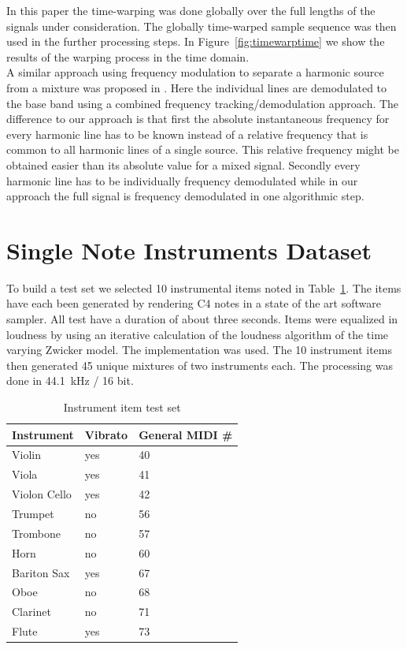 In this paper the time-warping was done globally over the full lengths of the
signals under consideration. The globally time-warped sample sequence
was then used in the further processing steps. In Figure~\ref{fig:timewarptime} we show the results of the warping process in the time domain. \\

A similar approach using frequency modulation to separate a harmonic
source from a mixture was proposed in \cite{wang95}. Here the
individual lines are demodulated to the base band using a combined frequency
tracking/demodulation approach. The difference to our approach is that first
the absolute instantaneous frequency for every harmonic line has to be known
instead of a relative frequency that is common to all harmonic lines of a single
source. This relative frequency might be obtained easier than its
absolute value for a mixed signal. Secondly every harmonic line has to be individually
frequency demodulated while in our approach the full signal is frequency demodulated in one algorithmic step.\\

\section{Single Note Instruments Dataset} %
\label{sub:test_set}

To build a test set we selected 10 instrumental items noted in Table~\ref{tab:testset}. The items have each been generated by rendering C4 notes in a state of the art software sampler. All test have a duration of about three seconds. Items were equalized in loudness by using an iterative calculation of the loudness algorithm of the time varying Zwicker model. The implementation \cite{genesis12} was used. The 10 instrument items then generated 45 unique mixtures of two instruments each. The processing was done in 44.1~kHz / 16 bit.

\begin{table}
\begin{center}
\footnotesize
\begin{tabular}{ l l l}
  Instrument & Vibrato &  General MIDI \# \\
  \hline
  Violin & yes & 40 \\
  Viola & yes & 41 \\
  Violon Cello & yes & 42 \\
  Trumpet & no & 56 \\
  Trombone & no & 57\\
  Horn & no & 60  \\
  Bariton Sax & yes & 67 \\ %
  Oboe & no & 68\\
  Clarinet & no & 71\\
  Flute & yes & 73\\
\end{tabular}
\end{center}
\caption{Instrument item test set}
\label{tab:testset}
\end{table}

